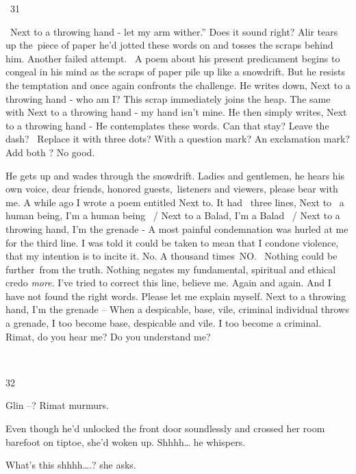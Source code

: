 \documentclass[letterpaper]{article}
\begin{document}
\bigskip

~31 

~{\textquotedbl}Next to a throwing hand - let my arm wither.'' Does it sound right? Alir tears up the~piece of paper
he'd jotted these words on{ }and tosses the scraps behind him. Another failed
attempt. \ A poem about his present predicament begins to congeal in his mind as the scraps of paper pile up like a
snowdrift. But he resists the temptation and once again confronts the challenge. He writes down, {\textquotedbl}Next to
a throwing hand - who am I?{\textquotedbl} This scrap immediately joins the heap. The same with {\textquotedbl}Next to
a throwing hand - my hand isn't mine.{\textquotedbl} He then simply{ }writes,
{\textquotedbl}Next to a throwing hand -{\textquotedbl} He contemplates these words. Can that stay? Leave the dash?
\ Replace it with three dots? With a question mark? An exclamation mark? Add both ? No good. 

He gets up and wades through the snowdrift. {\textquotedbl}Ladies and gentlemen,{\textquotedbl} he hears his own voice,
{\textquotedbl}dear friends, honored guests,~listeners and viewers, please bear with me. A while ago I wrote a poem
entitled {\textquotedbl}Next to{\textquotedbl}. It had~ three lines, {\textquotedbl}Next to ~a human being, I'm a human
being ~/ Next to a Balad, I'm a Balad ~/ Next to a throwing hand, I'm the grenade -{\textquotedbl} A most
painful{ }condemnation was hurled at me for the third line. I was told it could be taken to mean that I
condone violence, that my intention is to incite it. No. A thousand times~NO. \ Nothing could be further~from the
truth. Nothing negates my fundamental, spiritual and ethical credo \textit{more}. I've tried to correct this line,
believe me. Again and again. And I have not found the right words. Please let me explain myself. {\textquotedbl}Next to
a throwing hand, I'm the grenade --{\textquotedbl} When a despicable, base, vile, criminal individual throws a grenade,
I too become base, despicable{ }and vile. I too become a criminal. Rimat, do
you hear me? Do you understand me?

~

32 

{\textquotedbl}Glin --?{\textquotedbl} Rimat murmurs. 

Even though he'd unlocked the front door soundlessly and crossed her room barefoot on tiptoe, she'd woken up.
{\textquotedbl}Shhhh{\dots}{\textquotedbl} he whispers. 

{\textquotedbl}What's this shhhh{\dots}.?{\textquotedbl} she asks.
\end{document}
